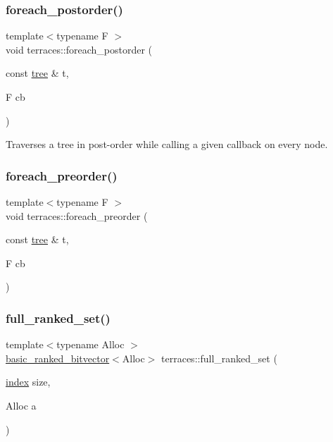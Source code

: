 \subsubsection{\texorpdfstring{foreach\+\_\+postorder()}{foreach\_postorder()}}
{\footnotesize\ttfamily template$<$typename F $>$ \\
void terraces\+::foreach\+\_\+postorder (\begin{DoxyParamCaption}\item[{const \hyperlink{namespaceterraces_a07aaf7feec4a22c6cdefc14c5a81bdd0}{tree} \&}]{t,  }\item[{F}]{cb }\end{DoxyParamCaption})}

Traverses a tree in post-\/order while calling a given callback on every node. \mbox{\label{namespaceterraces_a38d599d41ed134678e30b9cf7b454759}} 
\subsubsection{\texorpdfstring{foreach\+\_\+preorder()}{foreach\_preorder()}}
{\footnotesize\ttfamily template$<$typename F $>$ \\
void terraces\+::foreach\+\_\+preorder (\begin{DoxyParamCaption}\item[{const \hyperlink{namespaceterraces_a07aaf7feec4a22c6cdefc14c5a81bdd0}{tree} \&}]{t,  }\item[{F}]{cb }\end{DoxyParamCaption})}

\mbox{\label{namespaceterraces_a75e78e4205ecb8d8dbd3485c464741fe}} 
\subsubsection{\texorpdfstring{full\+\_\+ranked\+\_\+set()}{full\_ranked\_set()}}
{\footnotesize\ttfamily template$<$typename Alloc $>$ \\
\hyperlink{classterraces_1_1basic__ranked__bitvector}{basic\+\_\+ranked\+\_\+bitvector}$<$Alloc$>$ terraces\+::full\+\_\+ranked\+\_\+set (\begin{DoxyParamCaption}\item[{\hyperlink{namespaceterraces_adbc33ccb543d1634e96d0eb02e472c77}{index}}]{size,  }\item[{Alloc}]{a }\end{DoxyParamCaption})}

